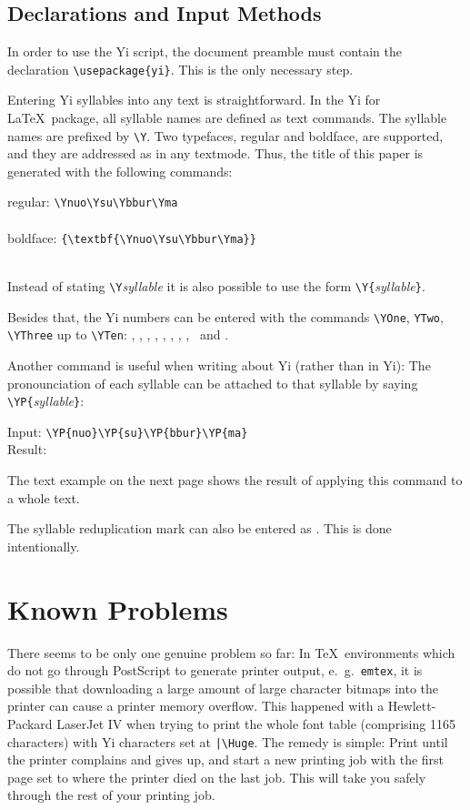 \documentclass[11pt,a4paper]{article}
\newcommand{\YiL}{\textsf{Yi for \LaTeX}}
\begin{document}
\subsection{Declarations and Input Methods}
In order to use the Yi script, the document preamble 
must contain the declaration \verb"\usepackage{yi}". This
is the only necessary step.

Entering Yi syllables into any text is straightforward. In the
\YiL\ package, all syllable names are defined as text commands.
The syllable names are prefixed by \verb"\Y". Two typefaces,
regular and boldface, are supported, and they are addressed as
in any textmode. Thus, the title
of this paper is generated with the following commands:
\begin{center}
	regular: \verb"\Ynuo\Ysu\Ybbur\Yma" \\
	\Ynuo\Ysu\Ybbur\Yma \\
	boldface: \verb"{\textbf{\Ynuo\Ysu\Ybbur\Yma}}" \\
	{\Large\textbf{\Ynuo\Ysu\Ybbur\Yma}}\\
\end{center} 

Instead of stating \verb"\Y"\emph{syllable} it is also possible 
to use the form \verb"\Y{"\emph{syllable}\verb"}".

Besides that, the Yi numbers can be entered with the commands
\verb"\YOne", \verb"YTwo", \verb"\YThree" up to \verb"\YTen":
\YOne, \YTwo, \YThree, \YFour, \YFive, \YSix, \YSeven, \YEight,
\YNine\ and \YTen.

Another command is useful when writing about Yi (rather than in Yi):
The pronounciation of each syllable can be attached to that syllable
by saying \verb"\YP{"\emph{syllable}\verb"}":
\begin{center}
	Input: \verb"\YP{nuo}\YP{su}\YP{bbur}\YP{ma}" \\
	Result:  \\
\end{center} 
The text example on the next page shows the result of applying this
command to a whole text.

The syllable reduplication mark  can also be entered as .
This is done intentionally.

\section{Known Problems}

There seems to be only one genuine problem so far: In \TeX\
environments which do not go through PostScript to generate
printer output, e.~g.~\verb"emtex", it is possible that downloading
a large amount of large character bitmaps into the printer can cause
a printer memory overflow. This happened with a Hewlett-Packard
LaserJet IV when trying to print the whole font table (comprising
1165 characters) with Yi characters set at \verb"|\Huge". The remedy
is simple: Print until the printer complains and gives up, and start
a new printing job with the first page set to where the printer died
on the last job.  This will take you safely through the rest of your
printing job.
\end{document}

